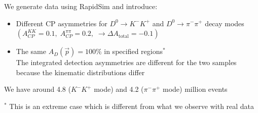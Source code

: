 \documentclass{beamer}
\begin{document}
\begin{frame}
      \frametitle{\insertsubsectionhead}
      \rightarrow We generate data using RapidSim and introduce:
      \begin{itemize}
            \item Different CP asymmetries for $D^0\to K^-K^+$ and $D^0\to\pi^-\pi^+$ decay modes $\left(A_{CP}^{KK} = 0.1,\; A_{CP}^{\pi\pi} = 0.2,\; \rightarrow \Delta A_\text{total} = -0.1\right)$
            \item The same $A_D(\vec{p}) = 100\%$ in specified regions$^*$ \\ \rightarrow The integrated detection asymmetries are different for the two samples because the kinematic distributions differ
      \end{itemize}
      \rightarrow We have around 4.8 ($K^-K^+$ mode) and 4.2 ($\pi^-\pi^+$ mode) million events
      \begin{figure}
            \centering
      \end{figure}
      \scriptsize
      $^*$ This is an extreme case which is different from what we observe with real data
\end{frame}
\end{document}
